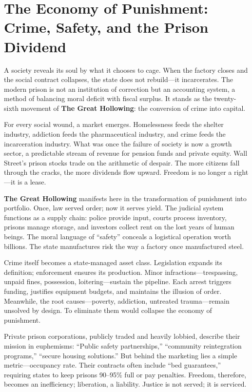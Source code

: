 \documentclass[11pt,twoside]{book}
\begin{document}
%
\chapter{The Economy of Punishment: Crime, Safety, and the Prison Dividend}
\label{ch:25.4}

A society reveals its soul by what it chooses to cage.  
When the factory closes and the social contract collapses, the state does not rebuild—it incarcerates.  
The modern prison is not an institution of correction but an accounting system, a method of balancing moral deficit with fiscal surplus.  
It stands as the twenty-sixth movement of \textbf{The Great Hollowing}: the conversion of crime into capital.

For every social wound, a market emerges.  
Homelessness feeds the shelter industry, addiction feeds the pharmaceutical industry, and crime feeds the incarceration industry.  
What was once the failure of society is now a growth sector, a predictable stream of revenue for pension funds and private equity.  
Wall Street’s prison stocks trade on the arithmetic of despair.  
The more citizens fall through the cracks, the more dividends flow upward.  
Freedom is no longer a right—it is a lease.

\textbf{The Great Hollowing} manifests here in the transformation of punishment into portfolio.  
Once, law served order; now it serves yield.  
The judicial system functions as a supply chain: police provide input, courts process inventory, prisons manage storage, and investors collect rent on the lost years of human beings.  
The moral language of “safety” conceals a logistical operation worth billions.  
The state manufactures risk the way a factory once manufactured steel.

Crime itself becomes a state-managed asset class.  
Legislation expands its definition; enforcement ensures its production.  
Minor infractions—trespassing, unpaid fines, possession, loitering—sustain the pipeline.  
Each arrest triggers funding, justifies equipment budgets, and maintains the illusion of order.  
Meanwhile, the root causes—poverty, addiction, untreated trauma—remain unsolved by design.  
To eliminate them would collapse the economy of punishment.

Private prison corporations, publicly traded and heavily lobbied, describe their mission in euphemisms:  
“Public safety partnerships,” “community reintegration programs,” “secure housing solutions.”  
But behind the marketing lies a simple metric—occupancy rate.  
Their contracts often include “bed guarantees,” requiring states to keep prisons 90–95\% full or pay penalties.  
Freedom, therefore, becomes an inefficiency; liberation, a liability.  
Justice is not served; it is serviced.
\end{document}

